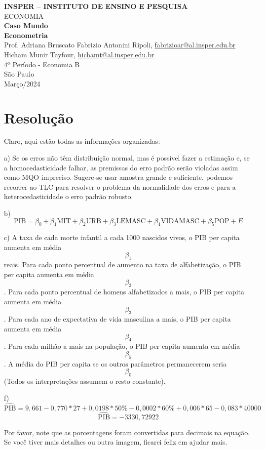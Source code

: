 \documentclass[a4paper,12pt]{article}[abntex2]
\begin{document}
\begin{titlepage}
    \centering
    \vspace*{1cm}
    \Large\textbf{INSPER – INSTITUTO DE ENSINO E PESQUISA}\\
    \Large ECONOMIA\\
    \vspace{1.5cm}
    \Large\textbf{Caso Mundo}\\
    \textbf{Econometria}\\
    \vspace{1.5cm}
    Prof. Adriana Bruscato
    \vfill
    \normalsize
    Fabrizio Antonini Ripoli, \href{mailto:fabrizioar@al.insper.edu.br}{fabrizioar@al.insper.edu.br}\\
    Hicham Munir Tayfour, \href{mailto:hichamt@al.insper.edu.br}{hichamt@al.insper.edu.br}\\
    4º Período - Economia B\\
    \vfill
    São Paulo\\
    Março/2024
\end{titlepage}

\newpage

\newpage
\tableofcontents
\thispagestyle{empty} %
\newpage
\setcounter{page}{1} %
\justify
\onehalfspacing

\pagestyle{fancy}
\fancyhf{}
\rhead{\thepage}

\section{\textbf{Resolução}}
Claro, aqui estão todas as informações organizadas:

a) Se os erros não têm distribuição normal, mas é possível fazer a estimação e, se a homocedasticidade falhar, as premissas do erro padrão serão violadas assim como MQO impreciso. Sugere-se usar amostra grande e suficiente, podemos recorrer ao TLC para resolver o problema da normalidade dos erros e para a heterocedasticidade o erro padrão robusto.

b) $$\text{PIB} = \beta_0 + \beta_1\text{MIT} + \beta_2\text{URB} + \beta_3\text{LEMASC} + \beta_4\text{VIDAMASC} + \beta_5\text{POP} + E$$

c) A taxa de cada morte infantil a cada 1000 nascidos vivos, o PIB per capita aumenta em média $$\beta_1$$ reais. Para cada ponto percentual de aumento na taxa de alfabetização, o PIB per capita aumenta em média $$\beta_2$$. Para cada ponto percentual de homens alfabetizados a mais, o PIB per capita aumenta em média $$\beta_3$$. Para cada ano de expectativa de vida masculina a mais, o PIB per capita aumenta em média $$\beta_4$$. Para cada milhão a mais na população, o PIB per capita aumenta em média $$\beta_5$$. A média do PIB per capita se os outros parâmetros permanecerem seria $$\beta_0$$ (Todos os interpretações assumem o resto constante).

f) $$\hat{\text{PIB}} = 9,661 - 0,770*27 + 0,0198 *50\% - 0,0002*60\% + 0,006*65 -0,083*40000$$
$$\hat{\text{PIB}}=-3330,72922$$

Por favor, note que as porcentagens foram convertidas para decimais na equação. Se você tiver mais detalhes ou outra imagem, ficarei feliz em ajudar mais.
\end{document}
